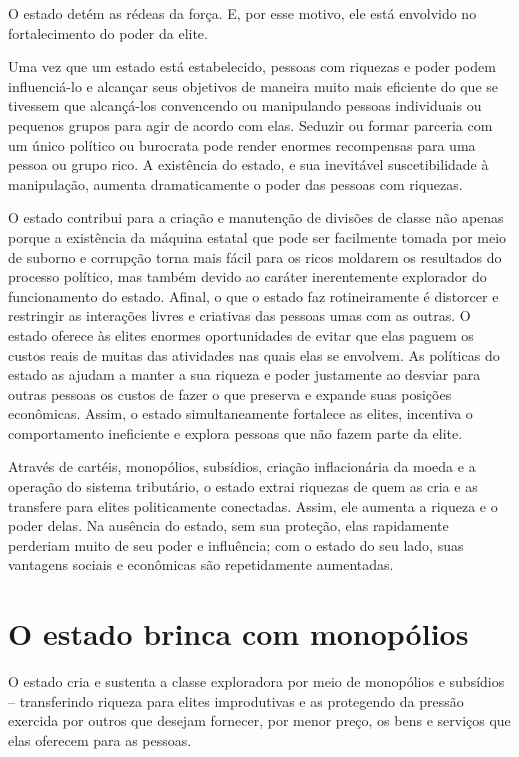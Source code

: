 O estado detém as rédeas da força. E, por esse motivo, ele está envolvido no fortalecimento do poder da elite. 

Uma vez que um estado está estabelecido, pessoas com riquezas e poder podem influenciá-lo e alcançar seus objetivos de maneira muito mais eficiente do que se tivessem que alcançá-los convencendo ou manipulando pessoas individuais ou pequenos grupos para agir de acordo com elas. Seduzir ou formar parceria com um único político ou burocrata pode render enormes recompensas para uma pessoa ou grupo rico. A existência do estado, e sua inevitável suscetibilidade à manipulação, aumenta dramaticamente o poder das pessoas com riquezas.

O estado contribui para a criação e manutenção de divisões de classe não apenas porque a existência da máquina estatal que pode ser facilmente tomada por meio de suborno e corrupção torna mais fácil para os ricos moldarem os resultados do processo político, mas também devido ao caráter inerentemente explorador do funcionamento do estado. Afinal, o que o estado faz rotineiramente é distorcer e restringir as interações livres e criativas das pessoas umas com as outras. O estado oferece às elites enormes oportunidades de evitar que elas paguem os custos reais de muitas das atividades nas quais elas se envolvem. As políticas do estado as ajudam a manter a sua riqueza e poder justamente ao desviar para outras pessoas os custos de fazer o que preserva e expande suas posições econômicas. Assim, o estado simultaneamente fortalece as elites, incentiva o comportamento ineficiente e explora pessoas que não fazem parte da elite.

Através de cartéis, monopólios, subsídios, criação inflacionária da moeda e a operação do sistema tributário, o estado extrai riquezas de quem as cria e as transfere para elites politicamente conectadas. Assim, ele aumenta a riqueza e o poder delas. Na ausência do estado, sem sua proteção, elas rapidamente perderiam muito de seu poder e influência; com o estado do seu lado, suas vantagens sociais e econômicas são repetidamente aumentadas.

\section{O estado brinca com monopólios}

O estado cria e sustenta a classe exploradora por meio de monopólios e subsídios -- transferindo riqueza para elites improdutivas e as protegendo da pressão exercida por outros que desejam fornecer, por menor preço, os bens e serviços que elas oferecem para as pessoas.


